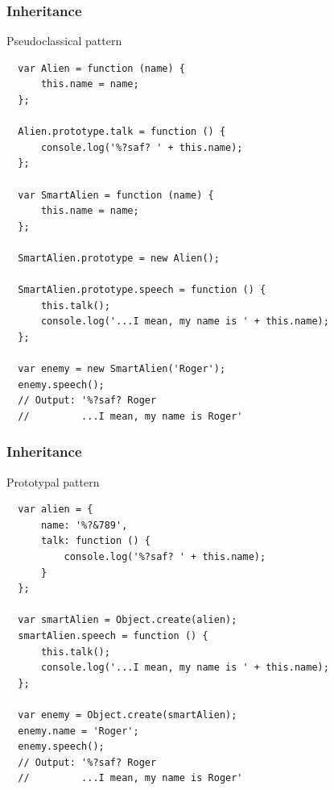 \begin{frame}[fragile]
  \frametitle{Inheritance}

  \begin{block}{Pseudoclassical pattern}
  {\tiny
  \begin{verbatim}
  var Alien = function (name) {
      this.name = name;
  };

  Alien.prototype.talk = function () {
      console.log('%?saf? ' + this.name);
  };

  var SmartAlien = function (name) {
      this.name = name;
  };

  SmartAlien.prototype = new Alien();

  SmartAlien.prototype.speech = function () {
      this.talk();
      console.log('...I mean, my name is ' + this.name);
  };

  var enemy = new SmartAlien('Roger');
  enemy.speech(); 
  // Output: '%?saf? Roger
  //         ...I mean, my name is Roger'
  \end{verbatim}
  }
  \end{block}
\end{frame}

\begin{frame}[fragile]
  \frametitle{Inheritance}

  \begin{block}{Prototypal pattern}
  {\tiny
  \begin{verbatim}
  var alien = {
      name: '%?&789',
      talk: function () {
          console.log('%?saf? ' + this.name);
      }
  };

  var smartAlien = Object.create(alien);
  smartAlien.speech = function () {
      this.talk();
      console.log('...I mean, my name is ' + this.name);
  };

  var enemy = Object.create(smartAlien);
  enemy.name = 'Roger';
  enemy.speech(); 
  // Output: '%?saf? Roger
  //         ...I mean, my name is Roger'
  \end{verbatim}
  }
  \end{block}
\end{frame}

